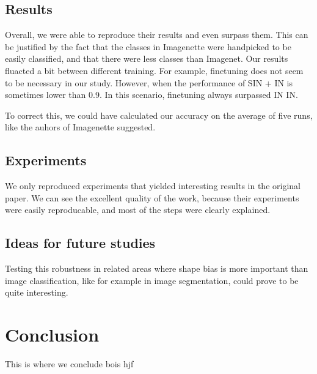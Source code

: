 \documentclass{article}
\begin{document}

\subsection{Results}

Overall, we were able to reproduce their results and
even surpass them. This can be justified by the fact that the classes
in Imagenette were handpicked to be easily classified, and that there were less 
classes than Imagenet.
Our results fluacted a bit between different training. For example, finetuning does not seem to be necessary 
in our study. However, when the performance of SIN + IN is sometimes lower than 0.9. In this scenario, finetuning
always surpassed IN \texorpdfstring{\textrightarrow} .IN. \medskip \par 

\noindent
To correct this, we could have calculated our accuracy on the average of five runs, like the auhors of Imagenette \cite{fastai2019}
suggested.

\subsection{Experiments}

We only reproduced experiments that yielded interesting results 
in the original paper. We can see the excellent quality of the work, 
because their experiments were easily reproducable, and most of the 
steps were clearly explained.

\subsection{Ideas for future studies}

Testing this robustness in related areas where shape bias
is more important than image classification, like for example in image segmentation,
could prove to be quite interesting.

\section{Conclusion}

This is where we conclude bois hjf

\newpage
\appendix



\end{document}
